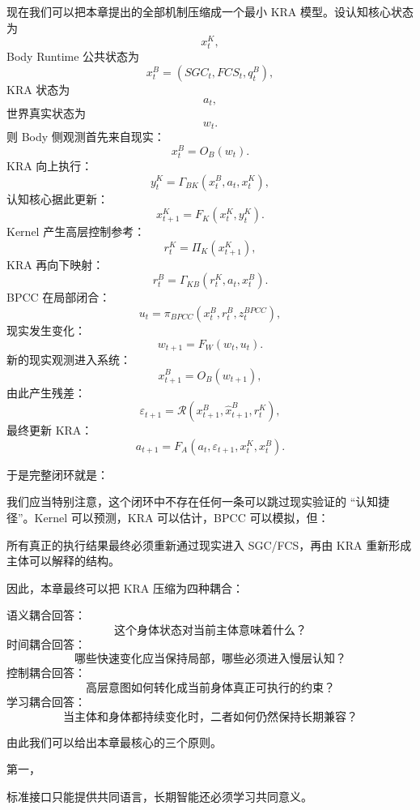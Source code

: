 现在我们可以把本章提出的全部机制压缩成一个最小 KRA 模型。设认知核心状态为
\[
x^K_t,
\]
Body Runtime 公共状态为
\[
x^B_t
=
(SGC_t,FCS_t,q^B_t),
\]
KRA 状态为
\[
a_t,
\]
世界真实状态为
\[
w_t.
\]
则 Body 侧观测首先来自现实：
\[
x^B_t
=
O_B(w_t).
\]
KRA 向上执行：
\[
y^K_t
=
\Gamma_{BK}
\left(
x^B_t,
a_t,
x^K_t
\right),
\]
认知核心据此更新：
\[
x^K_{t+1}
=
F_K
\left(
x^K_t,
y^K_t
\right).
\]
Kernel 产生高层控制参考：
\[
r^K_t
=
\Pi_K(x^K_{t+1}),
\]
KRA 再向下映射：
\[
r^B_t
=
\Gamma_{KB}
\left(
r^K_t,
a_t,
x^B_t
\right).
\]
BPCC 在局部闭合：
\[
u_t
=
\pi_{BPCC}
\left(
x^B_t,
r^B_t,
z_t^{BPCC}
\right),
\]
现实发生变化：
\[
w_{t+1}
=
F_W(w_t,u_t).
\]
新的现实观测进入系统：
\[
x^B_{t+1}
=
O_B(w_{t+1}),
\]
由此产生残差：
\[
\varepsilon_{t+1}
=
\mathcal R
\left(
x^B_{t+1},
\hat x^B_{t+1},
r^K_t
\right),
\]
最终更新 KRA：
\[
a_{t+1}
=
F_A
\left(
a_t,
\varepsilon_{t+1},
x^K_t,
x^B_t
\right).
\]

于是完整闭环就是：
\begin{statementbox}
\centering
{}
\end{statementbox}

我们应当特别注意，这个闭环中不存在任何一条可以跳过现实验证的 ``认知捷径''。Kernel 可以预测，KRA 可以估计，BPCC 可以模拟，但：
\begin{statementbox}
\centering
{}
\end{statementbox}
所有真正的执行结果最终必须重新通过现实进入 SGC/FCS，再由 KRA 重新形成主体可以解释的结构。

因此，本章最终可以把 KRA 压缩为四种耦合：
\begin{statementbox}
\centering
{}
\end{statementbox}
语义耦合回答：
\[
\text{这个身体状态对当前主体意味着什么？}
\]
时间耦合回答：
\[
\text{哪些快速变化应当保持局部，哪些必须进入慢层认知？}
\]
控制耦合回答：
\[
\text{高层意图如何转化成当前身体真正可执行的约束？}
\]
学习耦合回答：
\[
\text{当主体和身体都持续变化时，二者如何仍然保持长期兼容？}
\]

由此我们可以给出本章最核心的三个原则。

第一，
\begin{statementbox}
\centering
{}
\end{statementbox}
标准接口只能提供共同语言，长期智能还必须学习共同意义。

